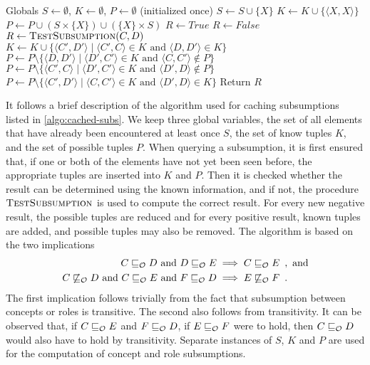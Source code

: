 \begin{algorithm}[ht]
  \begin{algorithmic}
    \State Globals \enspace $S \gets \emptyset$, \enspace $K \gets \emptyset$, \enspace $P \gets \emptyset$ \quad (initialized once)
      \State $S \gets S \cup \{ X \}$
      \State $K \gets K \cup \{ \langle X, X \rangle \}$
      \State $P \gets P \cup ( S \times \{ X \} ) \cup ( \{ X \} \times S )$
    \EndFor
      \State $R \gets \mathit{True}$
      \State $R \gets \mathit{False}$
    \Else
      \State $R \gets \textsc{TestSubsumption}(C, D)$
        \State $K \gets K \cup \{ \langle C', D' \rangle \mid \langle C', C \rangle \in K \text{ and } \langle D, D' \rangle \in K \}$
        \State $P \gets P \setminus \{ \langle D, D' \rangle \mid \langle D', C' \rangle \in K \text{ and } \langle C, C' \rangle \not\in P \}$
        \State $P \gets P \setminus \{ \langle C', C \rangle \mid \langle D', C' \rangle \in K \text{ and } \langle D', D \rangle \not\in P \}$
      \Else
        \State $P \gets P \setminus \{ \langle C', D' \rangle \mid \langle C, C' \rangle \in K \text{ and } \langle D', D \rangle \in K \}$
      \EndIf
    \EndIf
    \State Return $R$
  \end{algorithmic}
  \caption{$\textsc{CachedTestSubsumption}(C, D)$}
  \label{algo:cached-subs}
\end{algorithm}

It follows a brief description of the algorithm used for caching subsumptions listed in \cref{algo:cached-subs}. We keep three global variables, the set of all elements that have already been encountered at least once $S$, the set of know tuples $K$, and the set of possible tuples $P$. When querying a subsumption, it is first ensured that, if one or both of the elements have not yet been seen before, the appropriate tuples are inserted into $K$ and $P$. Then it is checked whether the result can be determined using the known information, and if not, the procedure $\textsc{TestSubsumption}$ is used to compute the correct result. For every new negative result, the possible tuples are reduced and for every positive result, known tuples are added, and possible tuples may also be removed. The algorithm is based on the two implications
\begin{align*}
  C \sqsubseteq_\mathcal{O} D \text{ and } D \sqsubseteq_\mathcal{O} E &\implies C \sqsubseteq_\mathcal{O} E \enspace,\text{ and} \\
  C \not\sqsubseteq_\mathcal{O} D \text{ and } C \sqsubseteq_\mathcal{O} E \text{ and } F \sqsubseteq_\mathcal{O} D &\implies E \not\sqsubseteq_\mathcal{O} F \enspace.
\end{align*}
The first implication follows trivially from the fact that subsumption between concepts or roles is transitive. The second also follows from transitivity. It can be observed that, if $C \sqsubseteq_\mathcal{O} E$ and $F \sqsubseteq_\mathcal{O} D$, if $E \sqsubseteq_\mathcal{O} F$ were to hold, then $C \sqsubseteq_\mathcal{O} D$ would also have to hold by transitivity. Separate instances of $S$, $K$ and $P$ are used for the computation of concept and role subsumptions.


